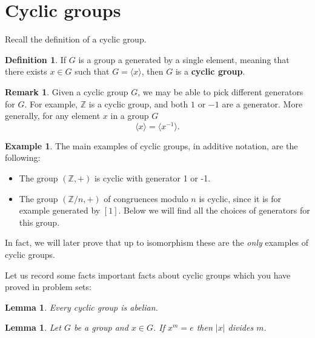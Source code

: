 \documentclass[12pt]{report}
\newtheorem{lemma}[theorem]{Lemma}
\numberwithin{equation}{section}
\numberwithin{theorem}{chapter}
\theoremstyle{definition}
\newtheorem{definition}[theorem]{Definition}
\newtheorem{example}[theorem]{Example}
\newtheorem*{basic properties}{Basic Properties}
\newtheorem*{Important Remark}{Important Remark}
\newtheorem{remark}[theorem]{Remark}
\newcommand{\df}[1]{{\bf #1}\index{#1}}
\begin{document}
\section{Cyclic groups}

Recall the definition of a cyclic group.

\begin{definition}
If $G$ is a group a generated by a single element, meaning that there exists $x \in G$ such that $G = \langle x \rangle$, then $G$ is a \df{cyclic group}.
\end{definition}

\begin{remark}
Given a cyclic group $G$, we may be able to pick different generators for $G$. For example, $\mathbb{Z}$ is a cyclic group, and both $1$ or $-1$ are a generator. More generally, for any element $x$ in a group $G$
$$\langle x \rangle= \langle x^{-1}\rangle.$$
\end{remark}


\begin{example}
The main examples of cyclic groups, in additive notation, are the following:
\begin{itemize}
\item The group $(\mathbb{Z},+)$ is cyclic with generator 1 or -1. 
\item The group $(\mathbb{Z}/n,+)$ of congruences modulo $n$ is cyclic, since it is for example generated by $[1]$. Below we will find all the choices of generators for this group.
\end{itemize}
In fact, we will later prove that up to isomorphism these are the {\em only} examples of cyclic groups.
\end{example}

Let us record some facts important facts about cyclic groups which you have proved in problem sets:


\begin{lemma}\label{cyclic abelian}
	Every cyclic group is abelian.
\end{lemma}

\begin{lemma}\label{order of an element divides any power that is identity}
Let $G$ be a group and $x \in G$. If $x^m = e$ then $|x|$ divides $m$.
\end{lemma}

\end{document}
